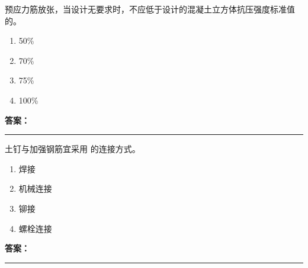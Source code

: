 \documentclass[UTF8,fontset=fandol,11pt]{ctexart}
\newcommand{\answerline}{\textcolor{answerred}{\rule{2.4cm}{0.7pt}}}
\begin{document}
\begin{quizbox}[title={乱序第 105 题｜第五章预应力混凝土工程}]

预应力筋放张，当设计无要求时，不应低于设计的混凝土立方体抗压强度标准值的。\\

\begin{enumerate}[label=\Alph*.]

\item 50\%

\item 70\%

\item 75\%

\item 100\%

\end{enumerate}

\textbf{\textcolor{answerred}{答案：}} \answerline

\end{quizbox}

\vspace{0.2em}

\begin{quizbox}[title={乱序第 106 题｜第三章基坑工程}]

土钉与加强钢筋宜采用 的连接方式。\\

\begin{enumerate}[label=\Alph*.]

\item 焊接

\item 机械连接

\item 铆接

\item 螺栓连接

\end{enumerate}

\textbf{\textcolor{answerred}{答案：}} \answerline

\end{quizbox}

\vspace{0.2em}
\end{document}
